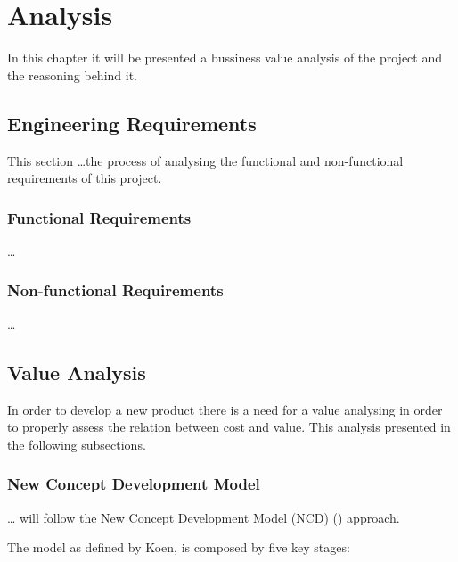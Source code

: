 
\chapter{Analysis} %
\label{chap:Chapter3} %

In this chapter it will be presented a bussiness value analysis of the project and the reasoning behind it. 

\section{Engineering Requirements}

This section \dots the process of analysing the functional and non-functional requirements of this project.

\subsection{Functional Requirements}

\dots

\subsection{Non-functional Requirements}

\dots

\section{Value Analysis}

In order to develop a new product there is a need for a value analysing in order to properly assess the relation between cost and value.
This analysis presented in the following subsections. 

\subsection{New Concept Development Model}

\dots
will follow the New Concept Development Model (NCD) (\cite{koen_2001}) approach.

The model as defined by Koen, is composed by five key stages:

